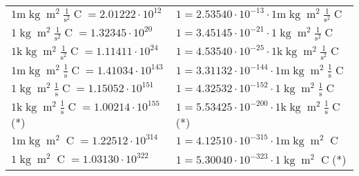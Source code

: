 \begin{center}
\begin{longtable}{l l}
{\color{gray}$1 \bm{\mathrm{ m}}\operatorname{kg}{\operatorname{m}^2}\frac1{\operatorname{s}^2}{\operatorname{C}}{} = 2.01222\cdot10^{12} $}   & {\color{gray}$ 1 = 2.53540\cdot10^{-13} \cdot 1 \bm{\mathrm{ m}}\operatorname{kg}{\operatorname{m}^2}\frac1{\operatorname{s}^2}{\operatorname{C}}{}$}  \\
{\color{black}$1 \bm{\mathrm{ }}\operatorname{kg}{\operatorname{m}^2}\frac1{\operatorname{s}^2}{\operatorname{C}}{} = 1.32345\cdot10^{20} $}   & {\color{black}$ 1 = 3.45145\cdot10^{-21} \cdot 1 \bm{\mathrm{ }}\operatorname{kg}{\operatorname{m}^2}\frac1{\operatorname{s}^2}{\operatorname{C}}{}$}  \\
{\color{gray}$1 \bm{\mathrm{ k}}\operatorname{kg}{\operatorname{m}^2}\frac1{\operatorname{s}^2}{\operatorname{C}}{} = 1.11411\cdot10^{24} $}   & {\color{gray}$ 1 = 4.53540\cdot10^{-25} \cdot 1 \bm{\mathrm{ k}}\operatorname{kg}{\operatorname{m}^2}\frac1{\operatorname{s}^2}{\operatorname{C}}{}$}  \\
{\color{gray}$1 \bm{\mathrm{ m}}\operatorname{kg}{\operatorname{m}^2}\frac1{\operatorname{s}}{\operatorname{C}}{} = 1.41034\cdot10^{143} $}   & {\color{gray}$ 1 = 3.31132\cdot10^{-144} \cdot 1 \bm{\mathrm{ m}}\operatorname{kg}{\operatorname{m}^2}\frac1{\operatorname{s}}{\operatorname{C}}{}$}  \\
{\color{black}$1 \bm{\mathrm{ }}\operatorname{kg}{\operatorname{m}^2}\frac1{\operatorname{s}}{\operatorname{C}}{} = 1.15052\cdot10^{151} $}   & {\color{black}$ 1 = 4.32532\cdot10^{-152} \cdot 1 \bm{\mathrm{ }}\operatorname{kg}{\operatorname{m}^2}\frac1{\operatorname{s}}{\operatorname{C}}{}$}  \\
{\color{gray}$1 \bm{\mathrm{ k}}\operatorname{kg}{\operatorname{m}^2}\frac1{\operatorname{s}}{\operatorname{C}}{} = 1.00214\cdot10^{155} $}\quad(*) & {\color{gray}$ 1 = 5.53425\cdot10^{-200} \cdot 1 \bm{\mathrm{ k}}\operatorname{kg}{\operatorname{m}^2}\frac1{\operatorname{s}}{\operatorname{C}}{}$}\quad(*)\\
{\color{gray}$1 \bm{\mathrm{ m}}\operatorname{kg}{\operatorname{m}^2}{}{\operatorname{C}}{} = 1.22512\cdot10^{314} $}   & {\color{gray}$ 1 = 4.12510\cdot10^{-315} \cdot 1 \bm{\mathrm{ m}}\operatorname{kg}{\operatorname{m}^2}{}{\operatorname{C}}{}$}  \\
{\color{black}$1 \bm{\mathrm{ }}\operatorname{kg}{\operatorname{m}^2}{}{\operatorname{C}}{} = 1.03130\cdot10^{322} $}   & {\color{black}$ 1 = 5.30040\cdot10^{-323} \cdot 1 \bm{\mathrm{ }}\operatorname{kg}{\operatorname{m}^2}{}{\operatorname{C}}{}$}\quad(*)\\

\end{longtable}
\end{center}
